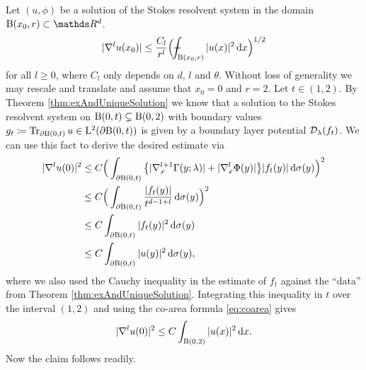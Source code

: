 \begin{rem}
  Let $(u,\phi)$ be a solution of the Stokes resolvent system in the domain $\BB(x_0, r) \subset \R^d$.
  \begin{align}
    \label{eq:interiorEstimateDoubleLayer}
    |\nabla^l u(x_0) | \leq \frac{C_l}{r^l} \Big( \dashint_{\BB(x_0, r)} |u(x)|^2 \d x \Big)^{1/2}
  \end{align}
  for all $l \geq 0$, where $C_l$ only depends on $d$, $l$ and $\theta$.
  Without loss of generality we may rescale and translate and assume that $x_0 = 0$ and $r = 2$.
  Let $t \in (1,2)$. By Theorem \ref{thm:exAndUniqueSolution} we know that a solution to the Stokes resolvent system on $\mathrm{B}(0, t) \subsetneq \mathrm{B}(0,2)$ with boundary values $g_t \coloneqq \operatorname{Tr}_{\partial\mathrm{B}(0,t)} u \in \mathrm{L}^2(\partial\mathrm{B}(0,t))$ is given by a boundary layer potential $\mathcal{D}_\lambda(f_t)$.
  We can use this fact to derive the desired estimate via
  \begin{align*}
    |\nabla^l u(0)|^2 
    &\leq C \Big( \int_{\partial \mathrm{B}(0, t)} \big\{ |\nabla_x^{l+1} \Gamma(y; \lambda)|  + |\nabla_x^l \Phi(y) | \big\} |f_t(y)| \, {\operatorname{d}\!{\sigma}}(y)\Big)^2 \\
    &\leq  C \Big( \int_{\partial \mathrm{B}(0,t)} \frac{|f_t(y)|}{t^{d - 1 + l}}  \, {\operatorname{d}\!{\sigma}}(y)\Big)^2 \\
    &\leq  C \int_{\partial \mathrm{B}(0,t)} |f_t(y)|^2  \, {\operatorname{d}\!{\sigma}}(y) \\
    &\leq C \int_{\partial \mathrm{B}(0,t)} |u(y)|^2 \, {\operatorname{d}\!{\sigma}}(y), 
  \end{align*}
  where we also used the Cauchy inequality in the estimate of $f_t$ against the ``data'' from Theorem \ref{thm:exAndUniqueSolution}.
  Integrating this inequality in $t$ over the interval $(1,2)$ and using the co-area formula \eqref{eq:coarea} gives 
  \begin{align*}
    |\nabla^l u(0)|^2 \leq C \int_{\mathrm{B}(0,2)} |u(x)|^2 \, {\operatorname{d}\!{x}}.
  \end{align*}
  Now the claim follows readily.
\end{rem}

